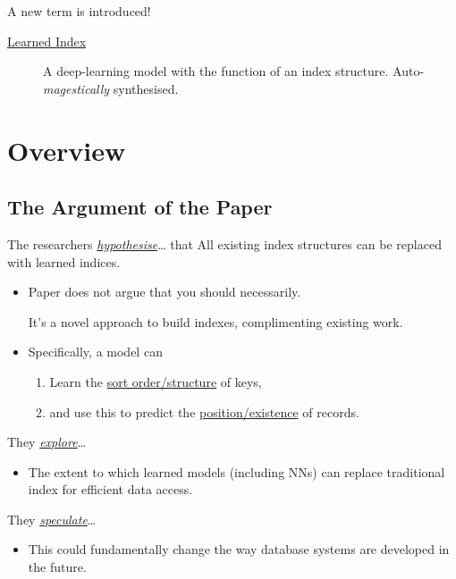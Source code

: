 \documentclass[presentation]{beamer}
\begin{document}
\begin{frame}[label={sec:orgcbb3e08}]{A new term is introduced!}
\begin{description}
\item[{\uline{\alert{Learned Index}}}] A deep-learning model with the function of an index structure.
Auto-\emph{magestically} synthesised.
\end{description}
\end{frame}

\section{Overview}
\label{sec:orgcbaf9aa}
\subsection{The Argument of the Paper}
\label{sec:org8c650c6}
\begin{frame}[label={sec:org58a0624}]{The researchers \uline{\emph{hypothesise}}\ldots{}}
that \alert{All} existing index structures \alert{can} be replaced with learned indices.
\begin{itemize}
\item Paper does not argue that you \alert{should} necessarily.

It's a novel approach to build indexes, complimenting existing work.

\item Specifically, a model can
\begin{enumerate}
\item \alert{Learn} the \uline{sort order/structure} of \alert{keys},
\item and use this to \alert{predict} the \uline{position/existence} of \alert{records}.
\end{enumerate}
\end{itemize}
\end{frame}

\begin{frame}[label={sec:org984b94a}]{They \uline{\emph{explore}}\ldots{}}
\begin{itemize}
\item The \alert{extent} to which learned models (including NNs) can replace traditional index for \alert{efficient data access}.
\end{itemize}
\end{frame}
\begin{frame}[label={sec:org24b45a4}]{They \uline{\emph{speculate}}\ldots{}}
\begin{itemize}
\item This could fundamentally change the way database systems are developed in the future.
\end{itemize}
\end{frame}
\end{document}
